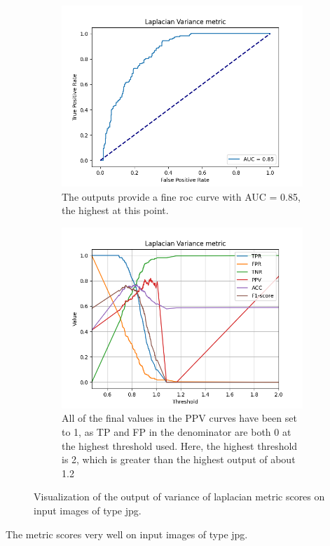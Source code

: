 \begin{figure}[H]
    \begin{subfigure}[t]{0.48\textwidth}
        \includegraphics[width=\textwidth]{Figures/lv/output_roc_lv_jpg.png}
        \caption{The outputs provide a fine roc curve with AUC = 0.85, the highest at this point.}
        \label{fig:LV_roc}
    \end{subfigure}\hspace{1em}
    \begin{subfigure}[t]{0.48\textwidth}
        \includegraphics[width=\textwidth]{Figures/lv/threshold_test_scores_lv_jpg.png}
        \caption{All of the final values in the PPV curves have been set to 1, as TP and FP in the denominator are both 0 at the highest threshold used. Here, the highest threshold is 2, which is greater than the highest output of about 1.2}
        \label{fig:LV_thresh}
    \end{subfigure}\hspace{1em}
    \caption{Visualization of the output of variance of laplacian metric scores on input images of type jpg.}
    \label{fig:LV_jpg}
\end{figure}
The metric scores very well on input images of type jpg.


